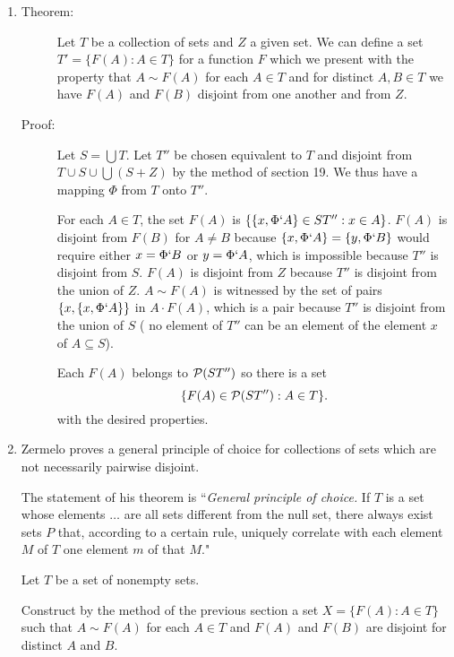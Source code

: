 \documentclass[12pt]{article}
\begin{document}
\begin{enumerate}
\begin{description}
\end{description}


\item \begin{description}

\item[Theorem:]Let $T$ be a collection of sets and $Z$ a given set.  We can define a set $T' = \{F(A):A \in T\}$ for a function $F$ which we present with the property that  $A \sim F(A)$ for
each $A \in T$ and
for distinct $A,B \in T$ we have $F(A)$ and $F(B)$ disjoint from one another and from $Z$.

\item[Proof:]  Let $S = \bigcup T$.  Let $T''$ be chosen equivalent to $T$ and disjoint from $T \cup S \cup \bigcup (S+Z)$ by the method of section 19.
We thus have a mapping $\Phi$ from $T$ onto $T''$.

For each $A \in T$, the set $F(A)$ is $\{\{x,\Phi`A\} \in ST'':x \in A\}$.  $F(A)$ is disjoint from $F(B)$ for $A \neq B$ because $\{x,\Phi`A\} = \{y,\Phi`B\}$ would require
either $x = \Phi`B$ or $y = \Phi`A$, which is impossible because $T''$ is disjoint from $S$.  $F(A)$ is disjoint from $Z$ because $T''$ is disjoint from the union of $Z$.
$A \sim F(A)$ is witnessed by the set of pairs $\{x,\{x,\Phi`A\}\}$ in $A\cdot F(A)$, which is a pair because $T''$ is disjoint from the union of $S$ ( no element of $T''$ can be an element of the element $x$ of $A \subseteq S$).

Each $F(A)$ belongs to ${\cal P}(ST'')$ so there is a set $$\{F(A) \in {\cal P}(ST''):A \in T\}.$$ with the desired properties.





\end{description}


\item  Zermelo proves a general principle of choice for collections of sets which are not necessarily pairwise disjoint.

The statement of his theorem is ``{\em General principle of choice.\/}  If $T$ is a set whose elements $\ldots$ are all sets different from the null set, there always exist sets $P$
that, according to a certain rule, uniquely correlate with each element $M$ of $T$ one element $m$ of that $M$."

Let $T$ be a set of nonempty sets.

Construct by the method of the previous section a set $X=\{F(A):A \in T\}$ such that $A \sim F(A)$ for each $A \in T$ and $F(A)$ and $F(B)$ are disjoint 
for distinct $A$ and $B$.


\end{enumerate}
\end{document}
